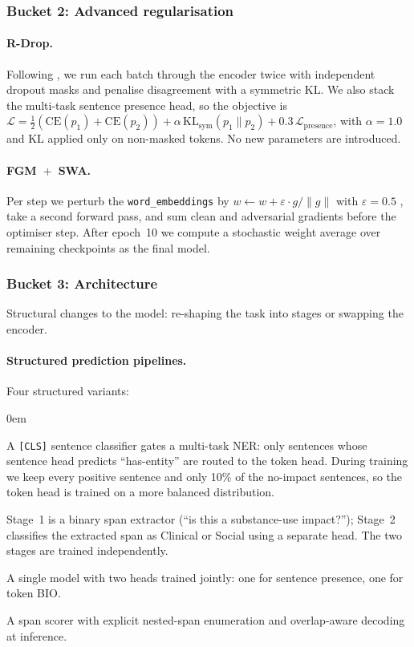 \documentclass[11pt]{article}
\begin{document}
\subsubsection{Bucket 2: Advanced regularisation}

\paragraph{R-Drop.} Following \citet{liang2021rdrop}, we run each batch
through the encoder twice with independent dropout masks and penalise
disagreement with a symmetric KL. We also stack the multi-task sentence
presence head, so the objective is $\mathcal{L} =
\tfrac{1}{2}(\text{CE}(p_1)+\text{CE}(p_2))
+\alpha\,\mathrm{KL}_{\mathrm{sym}}(p_1\|p_2)
+0.3\,\mathcal{L}_{\text{presence}}$, with $\alpha=1.0$ and KL applied
only on non-masked tokens. No new parameters are introduced.

\paragraph{FGM~$+$~SWA.} Per step we perturb the
\texttt{word\_embeddings} by $w \leftarrow w + \varepsilon\cdot g/\lVert
g\rVert$ with $\varepsilon=0.5$ \citep{miyato2017adversarial}, take a
second forward pass, and sum clean and adversarial gradients before the
optimiser step. After epoch~10 we compute a stochastic weight average
\citep{izmailov2018swa} over remaining checkpoints as the final model.

\subsubsection{Bucket 3: Architecture}

Structural changes to the model: re-shaping the task into stages or
swapping the encoder.

\paragraph{Structured prediction pipelines.} Four structured variants:

\begin{description}
\itemsep0em
\item[Hierarchical DeBERTa.] A \texttt{[CLS]} sentence classifier gates
a multi-task NER: only sentences whose sentence head predicts
``has-entity'' are routed to the token head. During training we keep
every positive sentence and only 10\% of the no-impact sentences, so
the token head is trained on a more balanced distribution.
\item[Two-Step Impact Pipeline.] Stage~1 is a binary span extractor
(``is this a substance-use impact?''); Stage~2 classifies the extracted
span as Clinical or Social using a separate head. The two stages are
trained independently.
\item[Sentence~$+$~Token Hierarchy.] A single model with two heads
trained jointly: one for sentence presence, one for token BIO.
\item[Span-nested GLiNER.] A span scorer with explicit nested-span
enumeration and overlap-aware decoding at inference.
\end{description}
\end{document}
